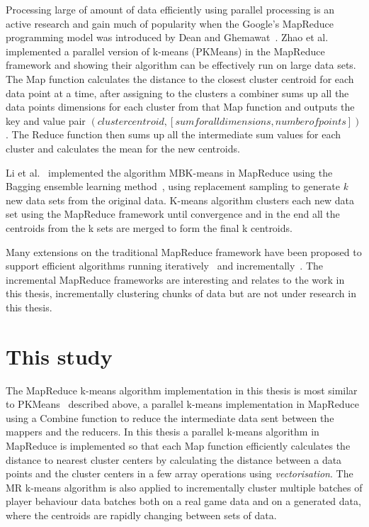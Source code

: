 Processing large of amount of data efficiently using parallel processing is an active research and gain much of popularity when the Google's MapReduce programming model was introduced by Dean and Ghemawat~\citep{Dean:2004}. Zhao et al.~\citep{Zhao:2009} implemented a parallel version of k-means (PKMeans) in the MapReduce framework and showing their algorithm can be effectively run on large data sets. The Map function calculates the distance to the closest cluster centroid for each data point at a time, after assigning to the clusters a combiner sums up all the data points dimensions for each cluster from that Map function and outputs the key and value pair $(cluster centroid, [sum for all dimensions, number of points])$. The Reduce function then sums up all the intermediate sum values for each cluster and calculates the mean for the new centroids. 

Li et al.~\citep{Li:2011} implemented the algorithm MBK-means in MapReduce using the Bagging ensemble learning method~\citep{Breiman:1996}, using replacement sampling to generate  \textit{k} new data sets from the original data. K-means algorithm clusters each new data set using the MapReduce framework until convergence and in the end all the centroids from the k sets are merged to form the final k centroids.

Many extensions on the traditional MapReduce framework have been proposed to support efficient algorithms running iteratively~\citep{Condie:2010HadoopOnline, Ekanayake:2010Twister, Zaharia:2010Spark, Bu:2010HaLoop, Bu:2012HaLoop, Yan:2012IncMr} and incrementally~\citep{Bhatotia:2011Incoop, Yan:2012IncMr, Bhatotia:2012Slider}. The incremental MapReduce frameworks are interesting and relates to the work in this thesis, incrementally clustering chunks of data but are not under research in this thesis.

\section{This study}
The MapReduce k-means algorithm implementation in this thesis is most similar to PKMeans~\citep{Zhao:2009} described above, a parallel k-means implementation in MapReduce using a Combine function to reduce the intermediate data sent between the mappers and the reducers. In this thesis a parallel k-means algorithm in MapReduce is implemented so that each Map function efficiently calculates the distance to nearest cluster centers by calculating the distance between a data points and the cluster centers in a few array operations using \textit{vectorisation}. The MR k-means algorithm is also applied to incrementally cluster multiple batches of player behaviour data batches both on a real game data and on a generated data, where the centroids are rapidly changing between sets of data. 

